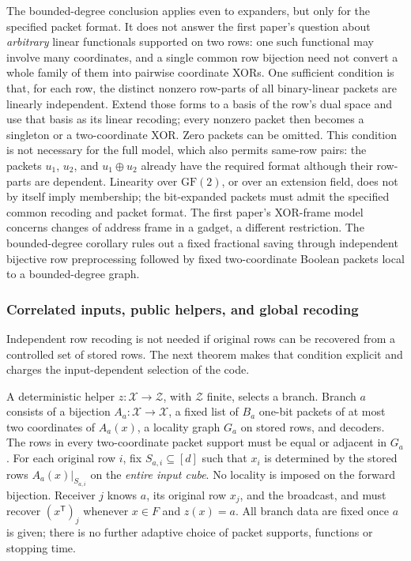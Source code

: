 The bounded-degree conclusion applies even to expanders, but only for the
specified packet format.  It does not answer the first paper's question about
\emph{arbitrary} linear functionals supported on two rows: one such functional
may involve many coordinates, and a single common row bijection need not
convert a whole family of them into pairwise coordinate XORs.
One sufficient condition is that, for each row, the distinct nonzero row-parts
of all binary-linear packets are linearly independent.  Extend those forms
to a basis of the row's dual space and use that basis as its linear recoding;
every nonzero packet then becomes a singleton or a two-coordinate XOR.
Zero packets can be omitted.  This condition is not necessary for the full
model, which also permits same-row pairs: the packets $u_1$, $u_2$, and
$u_1\oplus u_2$ already have the required format although their row-parts
are dependent.  Linearity over $\mathrm{GF}(2)$, or over an extension field,
does not by itself imply membership; the bit-expanded packets must admit
the specified common recoding and packet format.
The first paper's XOR-frame model concerns changes of address frame in a
gadget, a different restriction.  The bounded-degree corollary rules out a
fixed fractional saving through independent bijective row preprocessing
followed by fixed two-coordinate Boolean packets local to a bounded-degree graph.

\subsubsection{Correlated inputs, public helpers, and global recoding}

Independent row recoding is not needed if original rows can be recovered
from a controlled set of stored rows. The next theorem makes that condition
explicit and charges the input-dependent selection of the code.

\begin{definition}\label{def:local-inverse-packets}
A deterministic helper $z:\mathcal X\to\mathcal Z$, with $\mathcal Z$ finite,
selects a branch. Branch $a$ consists of a bijection
$A_a:\mathcal X\to\mathcal X$, a fixed list of $B_a$ one-bit packets of at
most two coordinates of $A_a(x)$, a locality graph $G_a$ on stored rows,
and decoders. The rows in every two-coordinate packet support must be equal
or adjacent in $G_a$. For each original row $i$, fix $S_{a,i}\subseteq[d]$ such that
$x_i$ is determined by the stored rows $A_a(x)|_{S_{a,i}}$ on the
\emph{entire input cube}. No locality is imposed on the forward bijection.
Receiver $j$ knows $a$, its original row $x_j$, and the broadcast, and must
recover $(x^{\mathsf T})_j$ whenever $x\in F$ and $z(x)=a$.
All branch data are fixed once $a$ is given; there is no further adaptive
choice of packet supports, functions or stopping time.
\end{definition}

